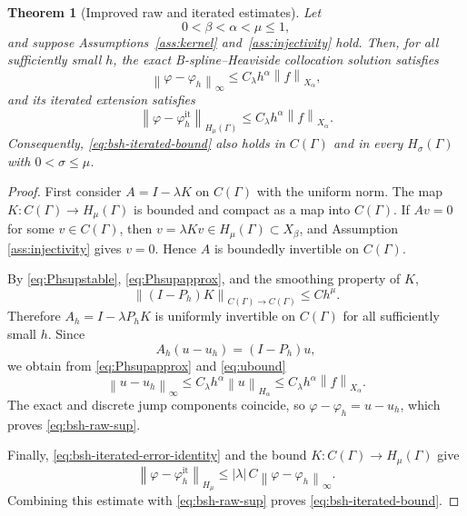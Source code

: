 \documentclass[10pt,a4paper]{amsart}
\newtheorem{theorem}{Theorem}
\newcommand{\Ga}{\Gamma}
\newcommand{\norm}[1]{\left\|#1\right\|}
\begin{document}
\begin{theorem}[Improved raw and iterated estimates]
\label{thm:bsh-iterated}
Let
\[
        0<\beta<\alpha<\mu\le1,
\]
and suppose Assumptions~\ref{ass:kernel} and~\ref{ass:injectivity} hold.
Then, for all sufficiently small $h$, the exact B-spline--Heaviside
collocation solution satisfies
\begin{equation}\label{eq:bsh-raw-sup}
        \norm{\varphi-\varphi_h}_{\infty}
        \le
        C_\lambda h^\alpha\norm{f}_{X_\alpha},
\end{equation}
and its iterated extension satisfies
\begin{equation}\label{eq:bsh-iterated-bound}
        \norm{\varphi-\varphi_h^{\mathrm{it}}}_{H_\mu(\Ga)}
        \le
        C_\lambda h^\alpha\norm{f}_{X_\alpha}.
\end{equation}
Consequently, \eqref{eq:bsh-iterated-bound} also holds in $C(\Ga)$ and in every $H_\sigma(\Ga)$ with $0<\sigma\le\mu$.
\end{theorem}

\begin{proof}
First consider $A=I-\lambda K$ on $C(\Ga)$ with the uniform norm.
The map $K:C(\Ga)\to H_\mu(\Ga)$ is bounded and compact as a map into
$C(\Ga)$.  If $Av=0$ for some $v\in C(\Ga)$, then
$v=\lambda Kv\in H_\mu(\Ga)\subset X_\beta$, and Assumption
\ref{ass:injectivity} gives $v=0$.  Hence $A$ is boundedly invertible on
$C(\Ga)$.

By \eqref{eq:Phsupstable}, \eqref{eq:Phsupapprox}, and the smoothing property
of $K$,
\[
        \norm{(I-P_h)K}_{C(\Ga)\to C(\Ga)}
        \le Ch^\mu.
\]
Therefore $A_h=I-\lambda P_hK$ is uniformly invertible on $C(\Ga)$ for all
sufficiently small $h$.  Since
\[
        A_h(u-u_h)=(I-P_h)u,
\]
we obtain from \eqref{eq:Phsupapprox} and \eqref{eq:ubound}
\[
        \norm{u-u_h}_{\infty}
        \le
        C_\lambda h^\alpha\norm{u}_{H_\alpha}
        \le
        C_\lambda h^\alpha\norm{f}_{X_\alpha}.
\]
The exact and discrete jump components coincide, so
$\varphi-\varphi_h=u-u_h$, which proves \eqref{eq:bsh-raw-sup}.

Finally, \eqref{eq:bsh-iterated-error-identity} and the bound
$K:C(\Ga)\to H_\mu(\Ga)$ give
\[
        \norm{\varphi-\varphi_h^{\mathrm{it}}}_{H_\mu}
        \le
        |\lambda|\,C\norm{\varphi-\varphi_h}_{\infty}.
\]
Combining this estimate with \eqref{eq:bsh-raw-sup} proves
\eqref{eq:bsh-iterated-bound}.
\end{proof}
\end{document}
